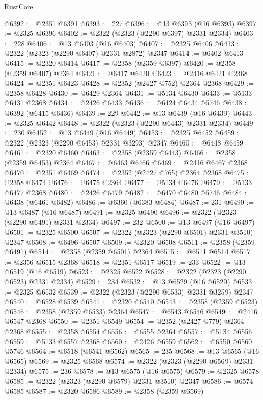 \begin{lexlean}{RustCore}
\begin{coremodule}
@6392 := @2351 @6391
@6393 := 227
@6396 := @13 @6393 (@16 @6393)
@6397 := @2325 @6396
@6402 := @2322 (@2323 (@2290 @6397) @2331 @2334)
@6403 := 228
@6406 := @13 @6403 (@16 @6403)
@6407 := @2325 @6406
@6413 := @2322 (@2323 (@2290 @6407) @2331 @2872) @2347
@6414 := @6402 @6413
@6415 := @2320 @6414
@6417 := @2358 (@2359 @6397)
@6420 := @2358 (@2359 @6407) @2364
@6421 := @6417 @6420
@6423 := @2416 @6421 @2368
@6424 := @2351 @6423
@6428 := @2352 (@2427 @752) @2364 @2368
@6429 := @2358 @6428
@6430 := @6429 @2364
@6431 := @5134 @6430
@6433 := @5133 @6431 @2368
@6434 := @2426 @6433
@6436 := @6424 @6434 @5746
@6438 := @6392 (@6415 @6436)
@6439 := 229
@6442 := @13 @6439 (@16 @6439)
@6443 := @2325 @6442
@6448 := @2322 (@2323 (@2290 @6443) @2331 @2334)
@6449 := 230
@6452 := @13 @6449 (@16 @6449)
@6453 := @2325 @6452
@6459 := @2322 (@2323 (@2290 @6453) @2331 @3293) @2347
@6460 := @6448 @6459
@6461 := @2320 @6460
@6463 := @2358 (@2359 @6443)
@6466 := @2358 (@2359 @6453) @2364
@6467 := @6463 @6466
@6469 := @2416 @6467 @2368
@6470 := @2351 @6469
@6474 := @2352 (@2427 @765) @2364 @2368
@6475 := @2358 @6474
@6476 := @6475 @2364
@6477 := @5134 @6476
@6479 := @5133 @6477 @2368
@6480 := @2426 @6479
@6482 := @6470 @6480 @5746
@6484 := @6438 (@6461 @6482)
@6486 := @6360 (@6383 @6484)
@6487 := 231
@6490 := @13 @6487 (@16 @6487)
@6491 := @2325 @6490
@6496 := @2322 (@2323 (@2290 @6491) @2331 @2334)
@6497 := 232
@6500 := @13 @6497 (@16 @6497)
@6501 := @2325 @6500
@6507 := @2322 (@2323 (@2290 @6501) @2331 @3510) @2347
@6508 := @6496 @6507
@6509 := @2320 @6508
@6511 := @2358 (@2359 @6491)
@6514 := @2358 (@2359 @6501) @2364
@6515 := @6511 @6514
@6517 := @2356 @6515 @2368
@6518 := @2351 @6517
@6519 := 233
@6522 := @13 @6519 (@16 @6519)
@6523 := @2325 @6522
@6528 := @2322 (@2323 (@2290 @6523) @2331 @2334)
@6529 := 234
@6532 := @13 @6529 (@16 @6529)
@6533 := @2325 @6532
@6539 := @2322 (@2323 (@2290 @6533) @2331 @3259) @2347
@6540 := @6528 @6539
@6541 := @2320 @6540
@6543 := @2358 (@2359 @6523)
@6546 := @2358 (@2359 @6533) @2364
@6547 := @6543 @6546
@6549 := @2416 @6547 @2368
@6550 := @2351 @6549
@6554 := @2352 (@2427 @779) @2364 @2368
@6555 := @2358 @6554
@6556 := @6555 @2364
@6557 := @5134 @6556
@6559 := @5133 @6557 @2368
@6560 := @2426 @6559
@6562 := @6550 @6560 @5746
@6564 := @6518 (@6541 @6562)
@6565 := 235
@6568 := @13 @6565 (@16 @6565)
@6569 := @2325 @6568
@6574 := @2322 (@2323 (@2290 @6569) @2331 @2334)
@6575 := 236
@6578 := @13 @6575 (@16 @6575)
@6579 := @2325 @6578
@6585 := @2322 (@2323 (@2290 @6579) @2331 @3510) @2347
@6586 := @6574 @6585
@6587 := @2320 @6586
@6589 := @2358 (@2359 @6569)

\end{coremodule}
\end{lexlean}
